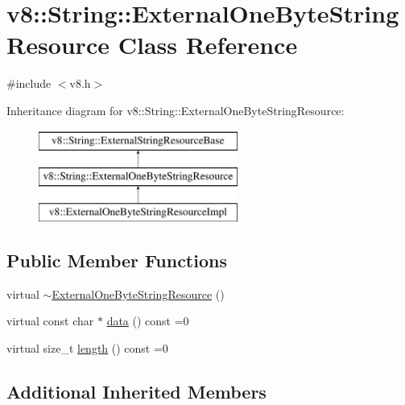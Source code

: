 \hypertarget{classv8_1_1String_1_1ExternalOneByteStringResource}{}\section{v8\+:\+:String\+:\+:External\+One\+Byte\+String\+Resource Class Reference}
\label{classv8_1_1String_1_1ExternalOneByteStringResource}


{\ttfamily \#include $<$v8.\+h$>$}

Inheritance diagram for v8\+:\+:String\+:\+:External\+One\+Byte\+String\+Resource\+:\begin{figure}[H]
\begin{center}
\leavevmode
\includegraphics[height=3.000000cm]{classv8_1_1String_1_1ExternalOneByteStringResource}
\end{center}
\end{figure}
\subsection*{Public Member Functions}
\begin{DoxyCompactItemize}
\item 
virtual \mbox{\hyperlink{classv8_1_1String_1_1ExternalOneByteStringResource_a443edbb33926b2a9480fe0caac6e95ab}{$\sim$\+External\+One\+Byte\+String\+Resource}} ()
\item 
virtual const char $\ast$ \mbox{\hyperlink{classv8_1_1String_1_1ExternalOneByteStringResource_aaeca31240d3dbf990d1b974e3c64593e}{data}} () const =0
\item 
virtual size\+\_\+t \mbox{\hyperlink{classv8_1_1String_1_1ExternalOneByteStringResource_ad6b702f05798bcfc3975cb922f32b5ab}{length}} () const =0
\end{DoxyCompactItemize}
\subsection*{Additional Inherited Members}



